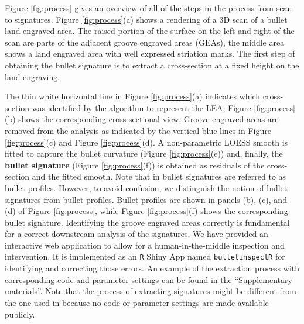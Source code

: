 Figure \ref{fig:process} gives an overview of all of the steps in the
process from scan to signatures. Figure \ref{fig:process}(a) shows a
rendering of a 3D scan of a bullet land engraved area. The raised
portion of the surface on the left and right of the scan are parts of
the adjacent groove engraved areas (GEAs), the middle area shows a land
engraved area with well expressed striation marks. The first step of
obtaining the bullet signature is to extract a cross-section at a fixed
height on the land engraving.

The thin white horizontal line in Figure \ref{fig:process}(a) indicates
which cross-section was identified by the algorithm to represent the
LEA; Figure \ref{fig:process}(b) shows the corresponding cross-sectional
view. Groove engraved areas are removed from the analysis as indicated
by the vertical blue lines in Figure \ref{fig:process}(c) and Figure
\ref{fig:process}(d). A non-parametric LOESS smooth \citep{loess} is
fitted to capture the bullet curvature (Figure \ref{fig:process}(e))
and, finally, the \textbf{bullet signature} (Figure
\ref{fig:process}(f)) is obtained as residuals of the cross-section and
the fitted smooth. Note that in \citet{cmps} bullet signatures are
referred to as bullet profiles. However, to avoid confusion, we
distinguish the notion of bullet signatures from bullet profiles. Bullet
profiles are shown in panels (b), (c), and (d) of Figure
\ref{fig:process}, while Figure \ref{fig:process}(f) shows the
corresponding bullet signature. Identifying the groove engraved areas
correctly is fundamental for a correct downstream analysis of the
signatures. We have provided an interactive web application to allow for
a human-in-the-middle inspection and intervention. It is implemented as
an \texttt{R} Shiny App \citep{shiny} named \texttt{bulletinspectR} for
identifying and correcting those errors. An example of the extraction
process with corresponding code and parameter settings can be found in
the ``Supplementary materials''. Note that the process of extracting
signatures might be different from the one used in \citet{cmps} because
no code or parameter settings are made available publicly.

